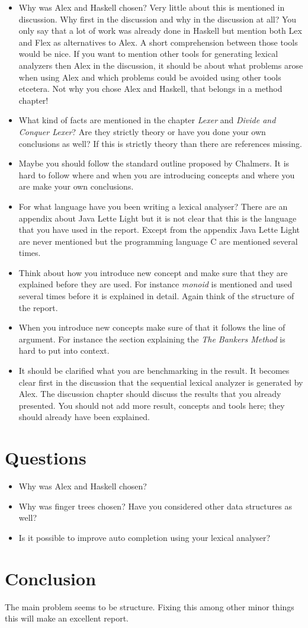 \documentclass{article}
\begin{document}
\begin{itemize}
\item Why was Alex and Haskell chosen? Very little about this is mentioned in
discussion. Why first in the discussion and why in the discussion at all? You
only say that a lot of work was already done in Haskell but mention both Lex and
Flex as alternatives to Alex. A short comprehension between those tools would be
nice. If you want to mention other tools for generating lexical analyzers then
Alex in the discussion, it should be about what problems arose when using Alex
and which problems could be avoided using other tools etcetera.  Not why you
chose Alex and Haskell, that belongs in a method chapter!
\item What kind of facts are mentioned in the chapter \emph{Lexer} and
\emph{Divide and Conquer Lexer}? Are they strictly theory or have you done
your own conclusions as well? If this is strictly theory than there are
references missing.
\item Maybe you should follow the standard outline proposed by
Chalmers. It is hard to follow where and when you are introducing concepts and
where you are make your own conclusions.
\item For what language have you been writing a lexical analyser? There are an
appendix about Java Lette Light but it is not clear that this is the language
that you have used in the report. Except from the appendix Java Lette Light are
never mentioned but the programming language C are mentioned several times.
\item Think about how you introduce new concept and make sure that they are
explained before they are used. For instance
\emph{monoid} is mentioned and used several times before it is explained in
detail. Again think of the structure of the report.
\item When you introduce new concepts make sure of that it follows the line of
argument. For instance the section explaining the \emph{The Bankers Method} is hard to put
into context.
\item It should be clarified what you are benchmarking in the result. It becomes
clear first in the discussion that the sequential lexical analyzer is generated by Alex.
The discussion chapter should discuss the results that you already presented.
You should not add more result, concepts and tools here; they should already
have been explained.
\end{itemize}

\section{Questions}
\begin{itemize}
\item Why was Alex and Haskell chosen?
\item Why was finger trees chosen? Have you considered other data structures as
well?
\item Is it possible to improve auto completion using your lexical analyser?
\end{itemize}

\section{Conclusion}
The main problem seems to be structure. Fixing this among other minor things
this will make an excellent report.
\end{document}
